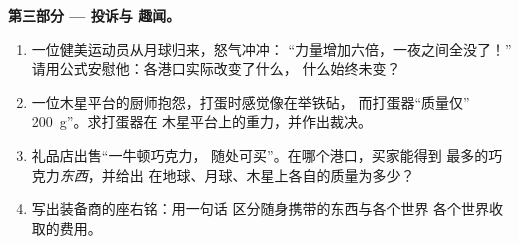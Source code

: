 \begin{problem}
\medskip\noindent\textbf{第三部分 --- 投诉与
趣闻。}
\begin{enumerate}[resume]
  \item 一位健美运动员从月球归来，怒气冲冲：
        “力量增加六倍，一夜之间全没了！”
        请用公式安慰他：各港口实际改变了什么，
        什么始终未变？
  \item 一位木星平台的厨师抱怨，打蛋时感觉像在举铁砧，
        而打蛋器“质量仅”
        \qty{200}{g}”。求打蛋器在
        木星平台上的重力，并作出裁决。
  \item 礼品店出售“一牛顿巧克力，
        随处可买”。在哪个港口，买家能得到
        最多的巧克力\emph{东西}，并给出
        在地球、月球、木星上各自的质量为多少？
  \item 写出装备商的座右铭：用一句话
        区分随身携带的东西与各个世界
        各个世界收取的费用。
\end{enumerate}
\end{problem}
